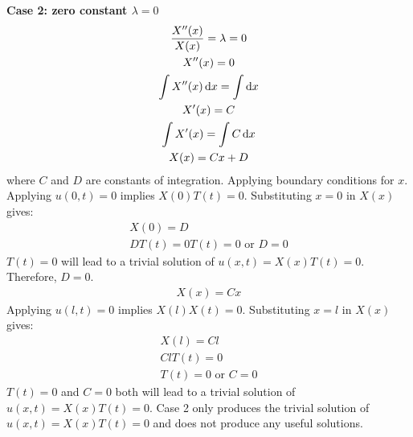 \documentclass[11pt]{article}
\numberwithin{equation}{section}
\begin{document}
\textbf{Case 2: zero constant $\lambda = 0$}
\begin{gather}
	\frac{X''(x)}{X(x)} = \lambda = 0\\
	X''(x) = 0\\
	\int X''(x) \dif x = \int \dif x\\
	X'(x) = C\\
	\int X'(x) = \int C \dif x\\
	X(x) = Cx + D
\end{gather}
where $C$ and $D$ are constants of integration. Applying boundary conditions for $x$. Applying $u(0,t) = 0$ implies $X(0)T(t) = 0$. Substituting $x=0$ in $X(x)$ gives:
\begin{gather}
	X(0) = D\\
	DT(t) = 0
	T(t) = 0 \textrm{ or } D = 0
\end{gather}
$T(t) = 0$ will lead to a trivial solution of $u(x,t) = X(x)T(t) =0$. Therefore, $D=0$.
\begin{align}
	X(x) = Cx
\end{align}
Applying $u(l,t) = 0$ implies $X(l)X(t) = 0$. Substituting $x=l$ in $X(x)$ gives:
\begin{gather}
	X(l) = Cl\\
	ClT(t) = 0\\
	T(t) = 0 \textrm{ or } C = 0
\end{gather}
$T(t) = 0$ and $C=0$ both will lead to a trivial solution of $u(x,t) = X(x)T(t) =0$. Case 2 only produces the trivial solution of $u(x,t) = X(x)T(t) =0$ and does not produce any useful solutions. 
\end{document}
